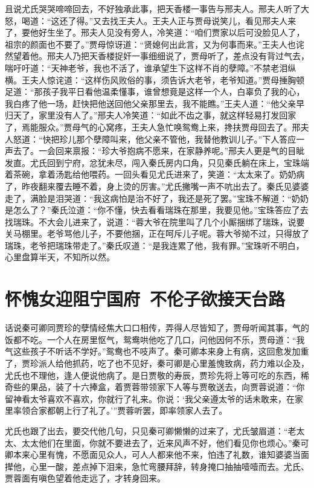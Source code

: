 \documentclass[12pt,oneside]{book}
\begin{document}
且说尤氏哭哭啼啼回去，不好独承此事，把天香楼一事告与邢夫人。邢夫人听了大怒，喝道：“这还了得。”又去找王夫人。王夫人正与贾母说笑儿，看见邢夫人来了，要他好生坐了。邢夫人见没有旁人，冷笑道：“咱们贾家以后可没脸见人了，祖宗的颜面也不要了。”贾母惊讶道：“贤媳何出此言，又为何事而来。”王夫人也诧然望着他。邢夫人乃把天香楼捉奸一事细细说了，贾母听了，差点没有背过气去，喘吁吁道：“天神老爷，我也不活了，谁承望生下这样不肖的孽障。”不禁老泪纵横。王夫人惊诧道：“这样伤风败俗的事，须告诉大老爷，老爷知道。”贾母捶胸顿足道：“那孩子我平日看他温柔懂事，谁曾想竟是这样一个人，白辜负了我的心，我白疼了他一场，赶快把他送回他父亲那里去，我不能瞧。”王夫人道：“他父亲早归天了，家里没有人了。”邢夫人冷笑道：“如此不齿之事，就这样轻易打发回家了，焉能服众。”贾母气的心窝疼，王夫人急忙唤鸳鸯上来，搀扶贾母回去了。邢夫人怒道：“快把珍儿那个孽障叫来，他父亲不管他，我替他教训儿子。”下人答应一声去了。一会回来禀报：“珍大爷抱病不愿来，在家静养呢。”邢夫人更是气的目眦发直。尤氏回到宁府，忿犹未尽，闯入秦氏房内口角，只见秦氏躺在床上，宝珠端着茶碗，拿着汤匙给他喂药。一回头看见尤氏进来了，笑道：“太太来了。奶奶病了，昨夜翻来覆去睡不着，身上烫的厉害。”尤氏撇嘴一声不吭出去了。秦氏见婆婆走了，满脸是泪哭道：“我这病怕是治不好了，我还是死了罢。”宝珠不解道：“奶奶是怎么了？”秦氏泣道：“你不懂，快去看看瑞珠在那里，我要见他。”宝珠答应了去找瑞珠。不大会儿进来了，说道：“蓉大爷在院里叫了几个小厮捆绑了瑞珠，说要关马棚里。老爷骂他儿子，不要他捆，正在呵斥儿子呢。蓉大爷拗不过，只得放了瑞珠，老爷把瑞珠带走了。”秦氏叹道：“是我连累了他，我有罪。”宝珠听不明白，心里盘算半天，不知所以然。


 
\chapter{怀愧女迎阻宁国府~不伦子欲接天台路}
话说秦可卿同贾珍的孽情经焦大口口相传，弄得人尽皆知了，贾母听闻其事，气的饭都不吃。一个人在房里怄气，鸳鸯哄他吃了几口，问他因何不乐，贾母道：“我气这些孩子不听话不学好。”鸳鸯也不吱声了。秦可卿本来身上有病，这回愈发加重了，贾珍派人给他抓药，吃了也不见好，秦可卿是心里羞愧致病，药力难以企及，尤氏也不理他，逢人便说他病了。是日贾敬的寿辰，贾珍先将上等可吃的东西，稀奇些的果品，装了十六捧盒，着贾蓉带领家下人等与贾敬送去，向贾蓉说道：“你留神看太爷喜欢不喜欢，你就行了礼来。你说：‘我父亲遵太爷的话未敢来，在家里率领合家都朝上行了礼了。’”贾蓉听罢，即率领家人去了。

尤氏也跟了出去，要交代他几句，只见秦可卿懒懒的过来了，尤氏皱眉道：“老太太、太太他们在里面，你就不要进去了，近来风声不好，他们看见你也烦心。”秦可卿本来心里有愧，不愿面见众人，可人人都来他不来，怕违了礼数，谁知婆婆当面撵他，心里一酸，差点掉下泪来，急忙弯腰拜辞，转身掩口抽抽噎噎而去。尤氏、贾蓉面有嗔色望着他走远了，才转身回来。 
\end{document}
